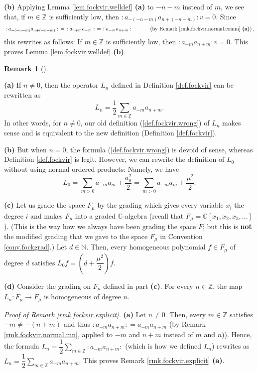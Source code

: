 \documentclass
[numbers=enddot,12pt,final,onecolumn,german,notitlepage]{scrartcl}%
\theoremstyle{definition}
\newtheorem{remk}[theo]{Remark}
\newenvironment{remark}[1][]
{\begin{remk}[#1]\begin{leftbar}}
{\end{leftbar}\end{remk}}
\begin{document}
\textbf{(b)} Applying Lemma \ref{lem.fockvir.welldef} \textbf{(a)} to $-n-m$
instead of $m$, we see that, if $m\in\mathbb{Z}$ is sufficiently low, then
$\left.  :a_{-\left(  -n-m\right)  }a_{n+\left(  -n-m\right)  }:\right.  v=0$.
Since%
\[
\left.  :a_{-\left(  -n-m\right)  }a_{n+\left(  -n-m\right)  }:\right.
=\left.  :a_{n+m}a_{-m}:\right.  =\left.  :a_{-m}a_{n+m}:\right.
\ \ \ \ \ \ \ \ \ \ \left(  \text{by Remark \ref{rmk.fockvir.normal.comm}
\textbf{(a)}}\right)  ,
\]
this rewrites as follows: If $m\in\mathbb{Z}$ is sufficiently low, then
$\left.  :a_{-m}a_{n+m}:\right.  v=0$. This proves Lemma
\ref{lem.fockvir.welldef} \textbf{(b)}.

\begin{remark}
\label{rmk.fockvir.explicit}\textbf{(a)} If $n\neq0$, then the operator
$L_{n}$ defined in Definition \ref{def.fockvir} can be rewritten as%
\[
L_{n}=\dfrac{1}{2}\sum\limits_{m\in\mathbb{Z}}a_{-m}a_{n+m}.
\]
In other words, for $n\neq0$, our old definition (\ref{def.fockvir.wrong}) of
$L_{n}$ makes sense and is equivalent to the new definition (Definition
\ref{def.fockvir}).

\textbf{(b)} But when $n=0$, the formula (\ref{def.fockvir.wrong}) is devoid
of sense, whereas Definition \ref{def.fockvir} is legit. However, we can
rewrite the definition of $L_{0}$ without using normal ordered products:
Namely, we have%
\[
L_{0}=\sum\limits_{m>0}a_{-m}a_{m}+\dfrac{a_{0}^{2}}{2}=\sum\limits_{m>0}%
a_{-m}a_{m}+\dfrac{\mu^{2}}{2}.
\]


\textbf{(c)} Let us grade the space $F_{\mu}$ by the grading which gives every
variable $x_{i}$ the degree $i$ and makes $F_{\mu}$ into a graded $\mathbb{C}%
$-algebra (recall that $F_{\mu}=\mathbb{C}\left[  x_{1},x_{2},x_{3}%
,...\right]  $). (This is the way how we always have been grading the space
$F$; but this is \textbf{not} the modified grading that we gave to the space
$F_{\mu}$ in Convention \ref{conv.fockgrad}.) Let $d\in\mathbb{N}$. Then,
every homogeneous polynomial $f\in F_{\mu}$ of degree $d$ satisfies
$L_{0}f=\left(  d+\dfrac{\mu^{2}}{2}\right)  f$.

\textbf{(d)} Consider the grading on $F_{\mu}$ defined in part \textbf{(c)}.
For every $n\in\mathbb{Z}$, the map $L_{n}:F_{\mu}\rightarrow F_{\mu}$ is
homogeneous of degree $n$.
\end{remark}

\textit{Proof of Remark \ref{rmk.fockvir.explicit}.} \textbf{(a)} Let $n\neq
0$. Then, every $m\in\mathbb{Z}$ satisfies $-m\neq-\left(  n+m\right)  $ and
thus $\left.  :a_{-m}a_{n+m}:\right.  =a_{-m}a_{n+m}$ (by Remark
\ref{rmk.fockvir.normal.mn}, applied to $-m$ and $n+m$ instead of $m$ and
$n$)). Hence, the formula $L_{n}=\dfrac{1}{2}\sum\limits_{m\in\mathbb{Z}%
}\left.  :a_{-m}a_{n+m}:\right.  $ (which is how we defined $L_{n}$) rewrites
as $L_{n}=\dfrac{1}{2}\sum\limits_{m\in\mathbb{Z}}a_{-m}a_{n+m}$. This proves
Remark \ref{rmk.fockvir.explicit} \textbf{(a)}.
\end{document}
